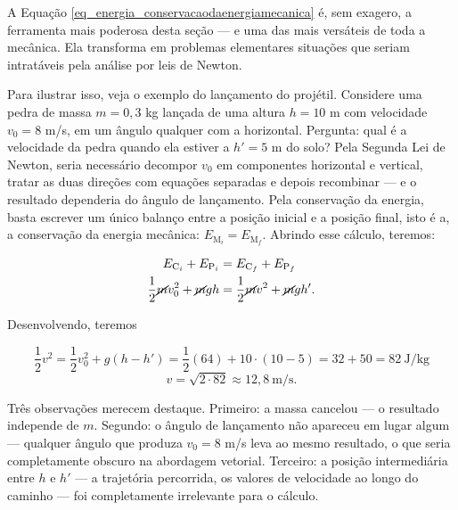 
A Equação \eqref{eq_energia_conservacaodaenergiamecanica} é, sem exagero, a ferramenta mais poderosa desta seção --- e uma
das mais versáteis de toda a mecânica. Ela transforma em problemas
elementares situações que seriam intratáveis pela análise por leis de Newton.

Para ilustrar isso, veja o exemplo do lançamento do projétil. Considere uma pedra de massa $m = 0{,}3$
kg lançada de uma altura $h = 10$ m com velocidade $v_0 = 8$ m/s, em um ângulo
qualquer com a horizontal. Pergunta: qual é a velocidade da pedra quando ela estiver
a $h' = 5$ m do solo? Pela Segunda Lei de Newton, seria necessário decompor $v_0$ em
componentes horizontal e vertical, tratar as duas direções com equações separadas e
depois recombinar --- e o resultado dependeria do ângulo de lançamento. Pela
conservação da energia, basta escrever um único balanço entre a posição inicial e a
posição final, isto é a, a conservação da energia mecânica: $E_{\text{M}_i} = E_{\text{M}_f}.$ Abrindo esse cálculo, teremos:

\begin{align}
    E_{\text{C}_i} + E_{\text{P}_i} &=  E_{\text{C}_f} + E_{\text{P}_f} \nonumber \\
     \frac{1}{2} \cancel mv_0^2 + \cancel mgh &= \frac{1}{2} \cancel mv^2 + \cancel mgh'. \nonumber
\end{align}
%

Desenvolvendo, teremos

\begin{equation*}
    \frac{1}{2}v^2 = \frac{1}{2}v_0^2 + g(h - h')
    = \frac{1}{2}(64) + 10 \cdot (10 - 5) = 32 + 50 = 82\ \text{J/kg}
\end{equation*}
%
\begin{equation*}
    v = \sqrt{2 \cdot 82} \approx 12{,}8\ \text{m/s.}
\end{equation*}

Três observações merecem destaque. Primeiro: a massa cancelou --- o resultado
independe de $m$. Segundo: o ângulo de lançamento não apareceu em lugar algum ---
qualquer ângulo que produza $v_0 = 8$ m/s leva ao mesmo resultado, o que seria
completamente obscuro na abordagem vetorial. Terceiro: a posição intermediária entre
$h$ e $h'$ --- a trajetória percorrida, os valores de velocidade ao longo do caminho
--- foi completamente irrelevante para o cálculo.

